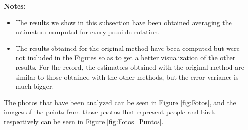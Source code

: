 \textbf{Notes:} 
\begin{itemize}
    \item The results we show in this subsection have been obtained averaging the estimators computed for every possible rotation.\\
    \item The results obtained for the original method have been computed but were not included in the Figures so as to get a better visualization of the other results. For the record, the estimators obtained with the original method are similar to those obtained with the other methods, but the error variance is much bigger. 
\end{itemize}
\vspace{2mm}

The photos that have been analyzed can be seen in Figure \ref{fig:Fotos}, and the images of the points from those photos that represent people and birds respectively can be seen in Figure \ref{fig:Fotos_Puntos}.\\

